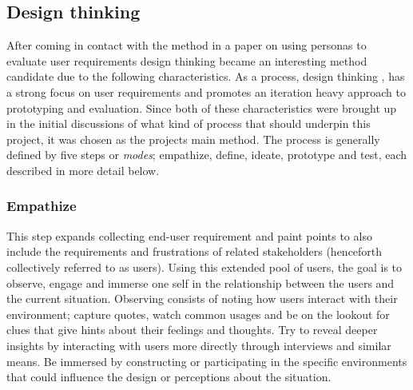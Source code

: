 \subsection{Design thinking}

  After coming in
  contact with the method in a paper on using personas to evaluate user
  requirements\cite{c_personas_article_controlled_experiment} design thinking
  became an interesting method candidate due to the following characteristics.
  As a process, design thinking%
    \cite{c_design_thinking_article_origins,
    c_design_thinking_online_nonpeer_dschool_stanford},
  has a strong focus on user requirements and
  promotes an iteration heavy approach to prototyping and evaluation. Since
  both of these characteristics were brought up in the initial discussions of
  what kind of process that should underpin this project, it was chosen as the
  projects main method. The process is generally defined by five steps or
  \textit{modes}; empathize, define, ideate, prototype and test, each
  described in more detail below.


  \subsubsection{Empathize}

    This step expands collecting end-user requirement and paint points
    to also include the requirements and frustrations of related stakeholders
    (henceforth collectively referred to as users).
    Using this extended pool of users, the goal is to observe, engage and
    immerse one self in the relationship between the users and the current
    situation. Observing consists of noting how users interact with their
    environment; capture quotes, watch common usages and be on the lookout for
    clues that give hints about their feelings and thoughts. Try to reveal
    deeper insights by interacting with users more directly through
    interviews and similar means. Be immersed by constructing or participating
    in the specific environments that could influence the design or
    perceptions about the situation. \\

